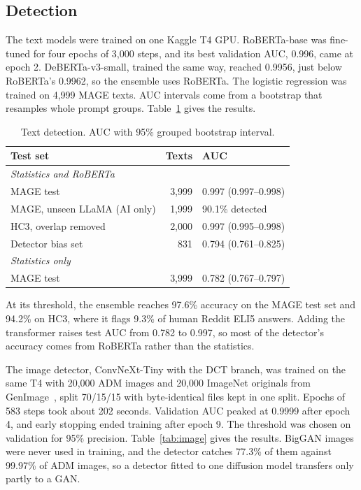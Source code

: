 \documentclass[conference]{IEEEtran}
\begin{document}
\subsection{Detection}
The text models were trained on one Kaggle T4 GPU. RoBERTa-base was fine-tuned for four epochs of 3,000 steps, and its best validation AUC, 0.996, came at epoch 2. DeBERTa-v3-small, trained the same way, reached 0.9956, just below RoBERTa's 0.9962, so the ensemble uses RoBERTa. The logistic regression was trained on 4,999 MAGE texts. AUC intervals come from a bootstrap that resamples whole prompt groups. Table~\ref{tab:text} gives the results.

\begin{table}[t]
\centering
\caption{Text detection. AUC with 95\% grouped bootstrap interval.}
\label{tab:text}
\begin{tabular}{lrl}
\toprule
\textbf{Test set} & \textbf{Texts} & \textbf{AUC} \\
\midrule
\multicolumn{3}{l}{\textit{Statistics and RoBERTa}} \\
MAGE test & 3,999 & 0.997 (0.997--0.998) \\
MAGE, unseen LLaMA (AI only) & 1,999 & 90.1\% detected \\
HC3, overlap removed & 2,000 & 0.997 (0.995--0.998) \\
Detector bias set & 831 & 0.794 (0.761--0.825) \\
\midrule
\multicolumn{3}{l}{\textit{Statistics only}} \\
MAGE test & 3,999 & 0.782 (0.767--0.797) \\
\bottomrule
\end{tabular}
\end{table}

At its threshold, the ensemble reaches 97.6\% accuracy on the MAGE test set and 94.2\% on HC3, where it flags 9.3\% of human Reddit ELI5 answers. Adding the transformer raises test AUC from 0.782 to 0.997, so most of the detector's accuracy comes from RoBERTa rather than the statistics.

The image detector, ConvNeXt-Tiny with the DCT branch, was trained on the same T4 with 20,000 ADM images and 20,000 ImageNet originals from GenImage~\cite{zhu2023genimage}, split 70/15/15 with byte-identical files kept in one split. Epochs of 583 steps took about 202 seconds. Validation AUC peaked at 0.9999 after epoch 4, and early stopping ended training after epoch 9. The threshold was chosen on validation for 95\% precision. Table~\ref{tab:image} gives the results. BigGAN images were never used in training, and the detector catches 77.3\% of them against 99.97\% of ADM images, so a detector fitted to one diffusion model transfers only partly to a GAN.
\end{document}
